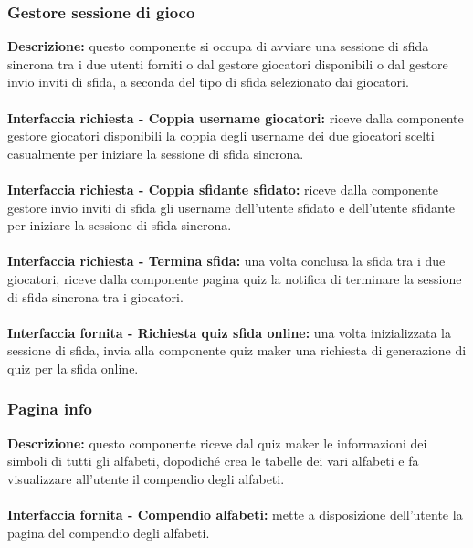 \subsubsection{Gestore sessione di gioco}
\textbf{Descrizione: }questo componente si occupa di avviare una sessione di sfida sincrona tra i due utenti forniti o dal gestore giocatori disponibili o dal gestore invio inviti di sfida, a seconda del tipo di sfida selezionato dai giocatori.\\
\\
\textbf{Interfaccia richiesta - Coppia username giocatori: }riceve dalla componente gestore giocatori disponibili la coppia degli username dei due giocatori scelti casualmente per iniziare la sessione di sfida sincrona.\\
\\
\textbf{Interfaccia richiesta - Coppia sfidante sfidato: }riceve dalla componente gestore invio inviti di sfida gli username dell'utente sfidato e dell'utente sfidante per iniziare la sessione di sfida sincrona.\\
\\
\textbf{Interfaccia richiesta - Termina sfida: }una volta conclusa la sfida tra i due giocatori, riceve dalla componente pagina quiz la notifica di terminare la sessione di sfida sincrona tra i giocatori.\\
\\
\textbf{Interfaccia fornita - Richiesta quiz sfida online: }una volta inizializzata la sessione di sfida, invia alla componente quiz maker una richiesta di generazione di quiz per la sfida online.\\

\subsubsection{Pagina info}
\textbf{Descrizione: }questo componente riceve dal quiz maker le informazioni dei simboli di tutti gli alfabeti, dopodiché crea le tabelle dei vari alfabeti e fa visualizzare all'utente il compendio degli alfabeti.\\
\\
\textbf{Interfaccia fornita - Compendio alfabeti: }mette a disposizione dell'utente la pagina del compendio degli alfabeti.\\

\newpage
